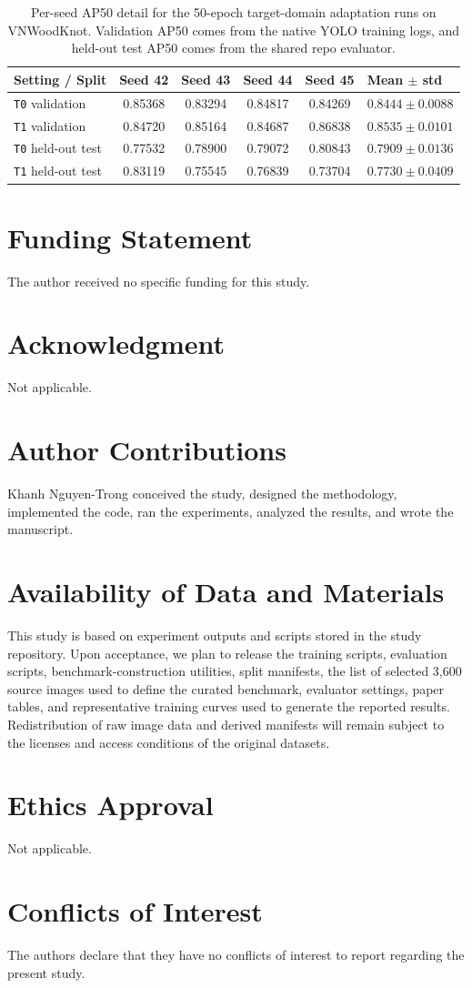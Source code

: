 \documentclass[10pt,a4paper]{article}
\begin{document}
\begin{table}[t]
  \centering
  \caption{Per-seed AP50 detail for the 50-epoch target-domain adaptation runs on VNWoodKnot. Validation AP50 comes from the native YOLO training logs, and held-out test AP50 comes from the shared repo evaluator.}
  \label{tab:app-transfer-perseed}
  \scriptsize
  \setlength{\tabcolsep}{4pt}
  \begin{tabularx}{\textwidth}{>{\raggedright\arraybackslash}p{} c c c c X}
    \toprule
    Setting / Split & Seed 42 & Seed 43 & Seed 44 & Seed 45 & Mean $\pm$ std \\
    \midrule
    \texttt{T0} validation & 0.85368 & 0.83294 & 0.84817 & 0.84269 & $0.8444 \pm 0.0088$ \\
    \texttt{T1} validation & 0.84720 & 0.85164 & 0.84687 & 0.86838 & $0.8535 \pm 0.0101$ \\
    \texttt{T0} held-out test & 0.77532 & 0.78900 & 0.79072 & 0.80843 & $0.7909 \pm 0.0136$ \\
    \texttt{T1} held-out test & 0.83119 & 0.75545 & 0.76839 & 0.73704 & $0.7730 \pm 0.0409$ \\
    \bottomrule
  \end{tabularx}
\end{table}

\section*{Funding Statement}
The author received no specific funding for this study.

\section*{Acknowledgment}
Not applicable.

\section*{Author Contributions}
Khanh Nguyen-Trong conceived the study, designed the methodology, implemented the code, ran the experiments, analyzed the results, and wrote the manuscript.

\section*{Availability of Data and Materials}
This study is based on experiment outputs and scripts stored in the study repository. Upon acceptance, we plan to release the training scripts, evaluation scripts, benchmark-construction utilities, split manifests, the list of selected 3,600 source images used to define the curated benchmark, evaluator settings, paper tables, and representative training curves used to generate the reported results. Redistribution of raw image data and derived manifests will remain subject to the licenses and access conditions of the original datasets.

\section*{Ethics Approval}
Not applicable.

\section*{Conflicts of Interest}
The authors declare that they have no conflicts of interest to report regarding the present study.



\end{document}
